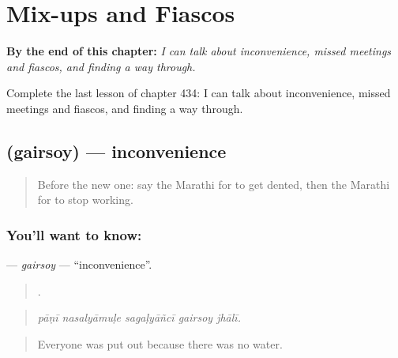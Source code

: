 
\chapter{Mix-ups and Fiascos}
\label{ch:mr-mix-ups-and-fiascos}

\begin{chapteropening}
\textbf{By the end of this chapter:} \emph{I can talk about inconvenience, missed meetings and fiascos, and finding a way through.}

Complete the last lesson of chapter 434: I can talk about inconvenience, missed meetings and fiascos, and finding a way through.
\end{chapteropening}

\section[\texorpdfstring{\mr{गैरसोय} (gairsoy)}{गैरसोय (gairsoy)}]{ (gairsoy) — inconvenience}

\label{lesson:MR-C434-gairsoy}



\begin{quote}
Before the new one: say the Marathi for to get dented, then the Marathi for to stop working.
\end{quote}

\subsection*{You'll want to know: }
\textbf{} — \emph{gairsoy} — \textquotedblleft{}inconvenience\textquotedblright{}.

\begin{quote}
    .
\end{quote}

\begin{quote}
\emph{pāṇī nasalyāmuḷe sagaḷyāñcī gairsoy jhālī.}
\end{quote}

\begin{quote}
Everyone was put out because there was no water.
\end{quote}


